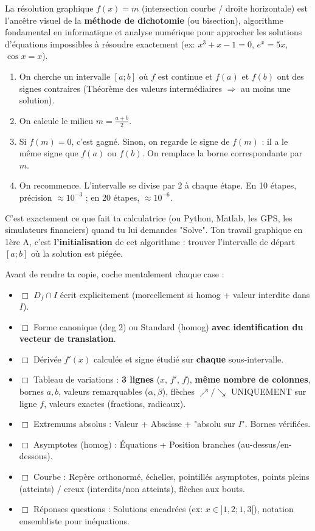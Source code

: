 \documentclass[11pt]{article}
\begin{document}
\begin{savaistu}
La résolution graphique $f(x)=m$ (intersection courbe / droite horizontale) est l'ancêtre visuel de la \textbf{méthode de dichotomie} (ou bisection), algorithme fondamental en informatique et analyse numérique pour approcher les solutions d'équations impossibles à résoudre exactement (ex: $x^3+x-1=0$, $e^x = 5x$, $\cos x = x$).
\begin{enumerate}
    \item On cherche un intervalle $[a;b]$ où $f$ est continue et $f(a)$ et $f(b)$ ont des signes contraires (Théorème des valeurs intermédiaires $\Rightarrow$ au moins une solution).
    \item On calcule le milieu $m = \frac{a+b}{2}$.
    \item Si $f(m)=0$, c'est gagné. Sinon, on regarde le signe de $f(m)$ : il a le même signe que $f(a)$ ou $f(b)$. On remplace la borne correspondante par $m$.
    \item On recommence. L'intervalle se divise par 2 à chaque étape. En 10 étapes, précision $\approx 10^{-3}$ ; en 20 étapes, $\approx 10^{-6}$.
\end{enumerate}
C'est exactement ce que fait ta calculatrice (ou Python, Matlab, les GPS, les simulateurs financiers) quand tu lui demandes "Solve". Ton travail graphique en 1ère A, c'est \textbf{l'initialisation} de cet algorithme : trouver l'intervalle de départ $[a;b]$ où la solution est piégée.
\end{savaistu}

\begin{aretenir}
Avant de rendre ta copie, coche mentalement chaque case :
\begin{itemize}
    \item $\Box$ $D_f \cap I$ écrit explicitement (morcellement si homog + valeur interdite dans $I$).
    \item $\Box$ Forme canonique (deg 2) ou Standard (homog) \textbf{avec identification du vecteur de translation}.
    \item $\Box$ Dérivée $f'(x)$ calculée et signe étudié sur \textbf{chaque} sous-intervalle.
    \item $\Box$ Tableau de variations : \textbf{3 lignes} ($x$, $f'$, $f$), \textbf{même nombre de colonnes}, bornes $a,b$, valeurs remarquables ($\alpha, \beta$), flèches $\nearrow/\searrow$ UNIQUEMENT sur ligne $f$, valeurs exactes (fractions, radicaux).
    \item $\Box$ Extremums absolus : Valeur + Abscisse + "absolu sur $I$". Bornes vérifiées.
    \item $\Box$ Asymptotes (homog) : Équations + Position branches (au-dessus/en-dessous).
    \item $\Box$ Courbe : Repère orthonormé, échelles, pointillés asymptotes, points pleins (atteints) / creux (interdits/non atteints), flèches aux bouts.
    \item $\Box$ Réponses questions : Solutions encadrées (ex: $x \in ]1,2; 1,3[$), notation ensembliste pour inéquations.
\end{itemize}
\end{aretenir}
\end{document}
